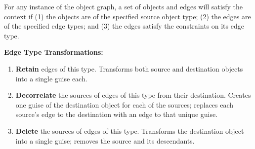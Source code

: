 For any instance of the object graph, a set of objects and edges will satisfy the context if (1) the
objects are of the specified source object type; (2) the edges are of the specified edge types; and
(3) the edges satisfy the constraints on its edge type.

\vspace{\baselineskip}\noindent\textbf{Edge Type Transformations:}
\begin{enumerate}[nosep]
    \item \textbf{Retain} edges of this type.
    Transforms both source and destination objects into a single guise each.
    \item \textbf{Decorrelate} the sources of edges of this type from their destination.
    Creates one guise of the destination object for each of the sources; replaces each source's
    edge to the destination with an edge to that unique guise.
    \item \textbf{Delete} the sources of edges of this type.
    Transforms the destination object into a single guise; removes the source and its descendants.
\end{enumerate}

